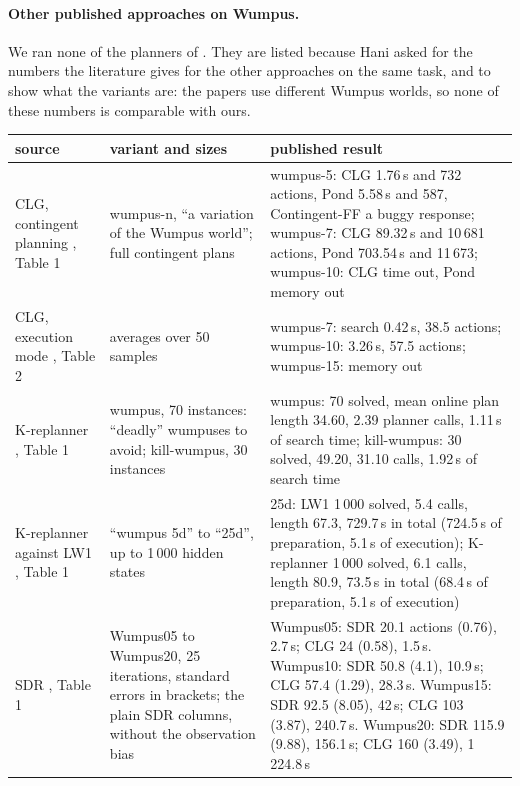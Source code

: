 \paragraph{Other published approaches on Wumpus.} We ran none of the planners of
. They are listed because Hani asked for the numbers the
literature gives for the other approaches on the same task, and to show what the
variants are: the papers use different Wumpus worlds, so none of these numbers
is comparable with ours.

\begin{table}[tbp]
\centering
\small
\begin{tabularx}{\textwidth}{@{}>{\raggedright\arraybackslash}p{3.0cm}>{\raggedright\arraybackslash}p{3.1cm}>{\raggedright\arraybackslash}X@{}}
\toprule
source & variant and sizes & published result \\
\midrule
CLG, contingent planning \cite{albore2009translation}, Table 1 &
wumpus-n, ``a variation of the Wumpus world''; full contingent plans &
wumpus-5: CLG 1.76\,s and 732 actions, Pond 5.58\,s and 587, Contingent-FF a
buggy response; wumpus-7: CLG 89.32\,s and 10\,681 actions, Pond 703.54\,s and 11\,673;
wumpus-10: CLG time out, Pond memory out \\
CLG, execution mode \cite{albore2009translation}, Table 2 &
averages over 50 samples &
wumpus-7: search 0.42\,s, 38.5 actions; wumpus-10: 3.26\,s, 57.5 actions;
wumpus-15: memory out \\
K-replanner \cite{bonet2011planning}, Table 1 &
wumpus, 70 instances: ``deadly'' wumpuses to avoid; kill-wumpus, 30 instances &
wumpus: 70 solved, mean online plan length 34.60, 2.39 planner calls, 1.11\,s of
search time; kill-wumpus: 30 solved, 49.20, 31.10 calls, 1.92\,s of search time \\
K-replanner against LW1 \cite{bonet2014flexible}, Table 1 &
``wumpus 5d'' to ``25d'', up to 1\,000 hidden states &
25d: LW1 1\,000 solved, 5.4 calls, length 67.3, 729.7\,s in total (724.5\,s of
preparation, 5.1\,s of execution); K-replanner 1\,000 solved, 6.1 calls, length 80.9,
73.5\,s in total (68.4\,s of preparation, 5.1\,s of execution) \\
SDR \cite{shani2011replanning}, Table 1 &
Wumpus05 to Wumpus20, 25 iterations, standard errors in brackets; the plain SDR
columns, without the observation bias &
Wumpus05: SDR 20.1 actions (0.76), 2.7\,s; CLG 24 (0.58), 1.5\,s.
Wumpus10: SDR 50.8 (4.1), 10.9\,s; CLG 57.4 (1.29), 28.3\,s.
Wumpus15: SDR 92.5 (8.05), 42\,s; CLG 103 (3.87), 240.7\,s.
Wumpus20: SDR 115.9 (9.88), 156.1\,s; CLG 160 (3.49), 1\,224.8\,s \\

\end{tabularx}
\end{table}
